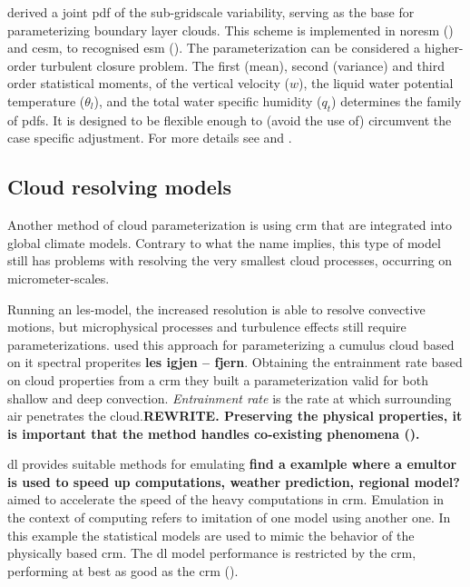 \cite{Golaz2002_part1} derived a joint \acrshort{pdf} of the sub-gridscale variability, serving as the base for parameterizing boundary layer clouds. This scheme is implemented in \acrfull{noresm} (\cite{SelandNORESM}) and \acrfull{cesm}, to recognised \acrshort{esm} (\cite{DanabasogluCESM}).
The parameterization can be considered a higher-order turbulent closure problem. The first (mean), second (variance) and third order statistical moments, of the vertical velocity ($w$), the liquid water potential temperature ($\theta_l$), and the total water specific humidity ($q_t$) determines the family of \acrshort{pdf}s. It is designed to be flexible enough to (avoid the use of) circumvent the case specific adjustment. For more details see \cite{Golaz2002_part1} and \cite{Golaz2002_part2}.

\subsection{Cloud resolving models} \label{sec:params_climate_models}
Another method of cloud parameterization is using \acrfull{crm} that are integrated into global climate models. Contrary to what the name implies, this type of model still has problems with resolving the very smallest cloud processes, occurring on micrometer-scales. 

Running an \acrfull{les}-model, the increased resolution is able to resolve convective motions, but microphysical processes and turbulence effects still require parameterizations. \citeauthor{Baba2019SpectralModel} used this approach for parameterizing a cumulus cloud based on it spectral properites \textbf{les igjen -- fjern}. Obtaining the entrainment rate based on cloud properties from a \acrshort{crm} they built a parameterization valid for both shallow and deep convection. \textit{Entrainment rate} is the rate at which surrounding air penetrates the cloud.\textbf{REWRITE. Preserving the physical properties, it is important that the method handles co-existing phenomena (\cite{Baba2019SpectralModel}). }

\acrshort{dl} provides suitable methods for emulating \textbf{find a examlple where a emultor is used to speed up computations, weather prediction, regional model?} %
aimed to accelerate the speed of the heavy computations in \acrshort{crm}. Emulation in the context of computing refers to imitation of one model using another one. In this example the statistical models are used to mimic the behavior of the physically based \acrshort{crm}. The \acrshort{dl} model performance is restricted by the  \acrshort{crm}, performing at best as good as the \acrshort{crm} (\cite{Rasp2018DeepModels}).